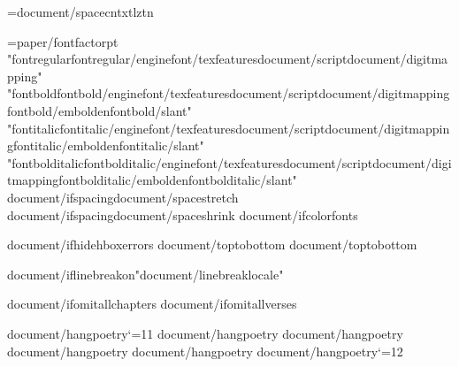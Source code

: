 \XeTeXinterwordspaceshaping={document/spacecntxtlztn}

={paper/fontfactor}pt
\def\regular{L_}{{"{fontregular}{fontregular/engine}{font/texfeatures}{document/script}{document/digitmapping}"}}
\def\bold{L_}{{"{fontbold}{fontbold/engine}{font/texfeatures}{document/script}{document/digitmapping}{fontbold/embolden}{fontbold/slant}"}}
\def\italic{L_}{{"{fontitalic}{fontitalic/engine}{font/texfeatures}{document/script}{document/digitmapping}{fontitalic/embolden}{fontitalic/slant}"}}
\def\bolditalic{L_}{{"{fontbolditalic}{fontbolditalic/engine}{font/texfeatures}{document/script}{document/digitmapping}{fontbolditalic/embolden}{fontbolditalic/slant}"}}
{document/ifspacing}\def\SpaceStretchFactor{L_}{{{document/spacestretch}}}
{document/ifspacing}\def\SpaceShrinkFactor{L_}{{{document/spaceshrink}}}
{document/ifcolorfonts}\ColorFontsfalse


{document/ifhidehboxerrors}\overfullrule=0pt
{document/toptobottom}     %
{document/toptobottom}\rotatetrue

{document/iflinebreakon}\XeTeXlinebreaklocale "{document/linebreaklocale}"

{document/ifomitallchapters}\def\AfterChapterSpaceFactor{{10}}
{document/ifomitallverses}\def\AfterVerseSpaceFactor{{0}}

{document/hangpoetry}\catcode`\@=11
{document/hangpoetry}
{document/hangpoetry}
{document/hangpoetry}
{document/hangpoetry}
{document/hangpoetry}\catcode`\@=12

